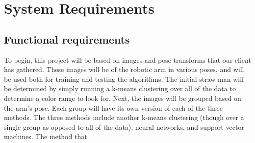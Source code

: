 \documentclass[10pt,journal,compsoc, draftclsnofoot,onecolumn]{IEEEtran}
\begin{document}
\section{System Requirements}

\subsection{Functional requirements}

To begin, this project will be based on images and pose transforms that our client has gathered.
These images will be of the robotic arm in various poses, and will be used both for training and testing the algorithms.
The initial straw man will be determined by simply running a k-means clustering over all of the data to determine a color range to look for.
Next, the images will be grouped based on the arm’s pose.
Each group will have its own version of each of the three methods.
The three methods include another k-means clustering (though over a single group as opposed to all of the data), neural networks, and support vector machines.
The method that 
\end{document}
